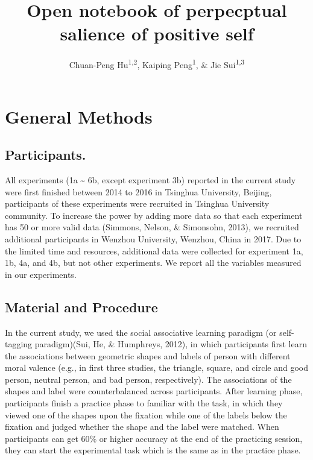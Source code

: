 \documentclass[man]{apa6}
\title{Open notebook of perpecptual salience of positive self}
\author{Chuan-Peng Hu\textsuperscript{1,2}, Kaiping Peng\textsuperscript{1}, \& Jie Sui\textsuperscript{1,3}}
\date{}
\affiliation{
\vspace{0.5cm}
\textsuperscript{1} Tsinghua University, 100084 Beijing, China\\\textsuperscript{2} German Resilience Center, 55131 Mainz, Germany\\\textsuperscript{3} University of Aberdeen, Aberdeen, Scotland}
\begin{document}
\maketitle

\hypertarget{general-methods}{%
\section{General Methods}\label{general-methods}}

\hypertarget{participants.}{%
\subsection{Participants.}\label{participants.}}

All experiments (1a \textasciitilde{} 6b, except experiment 3b) reported in the current study were first finished between 2014 to 2016 in Tsinghua University, Beijing, participants of these experiments were recruited in Tsinghua University community. To increase the power by adding more data so that each experiment has 50 or more valid data (Simmons, Nelson, \& Simonsohn, 2013), we recruited additional participants in Wenzhou University, Wenzhou, China in 2017. Due to the limited time and resources, additional data were collected for experiment 1a, 1b, 4a, and 4b, but not other experiments. We report all the variables measured in our experiments.

\hypertarget{material-and-procedure}{%
\subsection{Material and Procedure}\label{material-and-procedure}}

In the current study, we used the social associative learning paradigm (or self-tagging paradigm)(Sui, He, \& Humphreys, 2012), in which participants first learn the associations between geometric shapes and labels of person with different moral valence (e.g., in first three studies, the triangle, square, and circle and good person, neutral person, and bad person, respectively). The associations of the shapes and label were counterbalanced across participants. After learning phase, participants finish a practice phase to familiar with the task, in which they viewed one of the shapes upon the fixation while one of the labels below the fixation and judged whether the shape and the label were matched. When participants can get 60\% or higher accuracy at the end of the practicing session, they can start the experimental task which is the same as in the practice phase.
\end{document}

